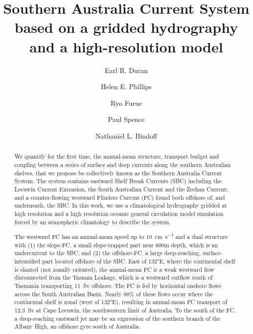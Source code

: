 \documentclass[preprint,3p,review,12pt]{elsarticle}
\begin{document}
\begin{frontmatter}

\title{Southern Australia Current System based on a gridded hydrography and a high-resolution model}

\author[label2]{Earl R. Duran}
\author[label3,label4]{Helen E. Phillips}
\author[label5]{Ryo Furue}
\author[label2,label4]{Paul Spence}
\author[label3,label4,label6,label7]{Nathaniel L. Bindoff}

\address[label2]{Climate Change Research Centre (CCRC), University of New South Wales, Sydney, NSW 2052 Australia}
\address[label3]{Institute for Marine and Antarctic Studies (IMAS), Hobart, Tasmania, Australia}
\address[label4]{ARC Centre of Excellence for Climate Extremes (CLEX)}\address[label5]{Japan Agency for Marine-Earth Science and Technology (JAMSTEC), Yokohama, Japan}
\address[label6]{Commonwealth Scientific and Industrial Research Organisation (CSIRO)}
\address[label7]{Antarctic Climate and Ecosystems Cooperative Research Centre (ACE CRC), Hobart, Tasmania, Australia}


\begin{abstract}
We quantify for the first time, the annual-mean structure, transport budget and coupling between a series of surface and deep currents along the southern Australian shelves, that we propose be collectively known as the Southern Australia Current System. The system contains eastward Shelf Break Currents (SBC) including the Leeuwin Current Extension, the South Australian Current and the Zeehan Current; and a counter-flowing westward Flinders Current (FC) found both offshore of, and underneath, the SBC\@.
In this work, we use a climatological hydrography gridded at high resolution and a high resolution oceanic general circulation model simulation forced by an atmospheric climatology to describe the system.

The westward FC has an annual-mean speed up to \SI{10}{\centi\meter\per\second} and a dual structure with (1) the slope-FC, a small slope-trapped part near 600m depth, which is an undercurrent to the SBC; and (2) the offshore-FC, a large deep-reaching, surface-intensified part located offshore of the SBC\@.
East of \ang{132}E, where the continental shelf is slanted (not zonally oriented), the annual-mean FC is a weak westward flow disconnected from the Tasman Leakage, which is a westward outflow south of Tasmania transporting \SI{11}{Sv} offshore.
The FC is fed by horizontal onshore flows across the South Australian Basin. Nearly 80\% of these flows occur where the continental shelf is zonal (west of \ang{132}E), resulting in annual-mean FC transport of \SI{12.3}{Sv} at Cape Leeuwin, the southwestern limit of Australia.
To the south of the FC, a deep-reaching eastward jet may be an expression of the southern branch of the Albany High, an offshore gyre south of Australia.


\end{abstract}
\end{frontmatter}
\end{document}
